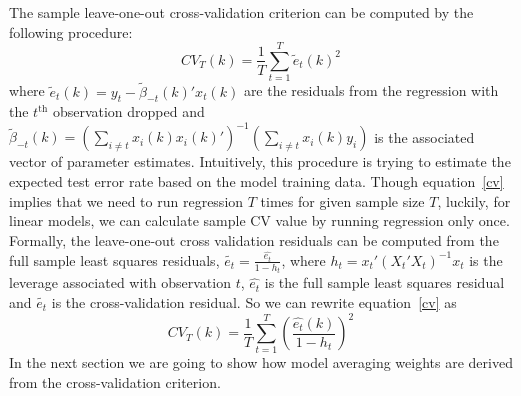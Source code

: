 The sample leave-one-out cross-validation criterion can be computed by the following procedure:
\begin{equation} \label{cv}
	CV_T(k) = \frac{1}{T}\sum_{t=1}^{T}\tilde{e}_{t}(k)^{2}
\end{equation}
where $\tilde{e}_{t}(k) = y_t - \tilde{\beta}_{-t}(k)'x_t(k)$ are the residuals from the regression with the $t^{\mathrm{th}}$ observation dropped and $\tilde{\beta}_{-t}(k) = (\sum_{i\not= t}x_i(k) x_i(k)')^{-1}(\sum_{i\not= t}x_i(k) y_i)$ is the associated vector of parameter estimates. Intuitively, this procedure is trying to estimate the expected test error rate based on the model training data. Though equation~\ref{cv} implies that we need to run regression $T$ times for given sample size $T$, luckily, for linear models, we can calculate sample CV value by running regression only once. Formally, the leave-one-out cross validation residuals can be computed from the full sample least squares residuals, $\tilde{e_{t}} = \frac{\hat{e_{t}}}{1 - h_{t}}$, where $h_{t} = x_{t}'(X_{t}'X_{t})^{-1}x_{t}$ is the leverage associated with observation $t$, $\hat{e_{t}}$ is the full sample least squares residual and $\tilde{e_{t}}$ is the cross-validation residual. So we can rewrite equation~\ref{cv} as
\begin{equation}
    CV_T(k) = \frac{1}{T}\sum_{t=1}^{T}\left( \frac{\hat{e_{t}}(k)}{1 - h_{t}} \right)^{2}
\end{equation}
In the next section we are going to show how model averaging weights are derived from the cross-validation criterion.
